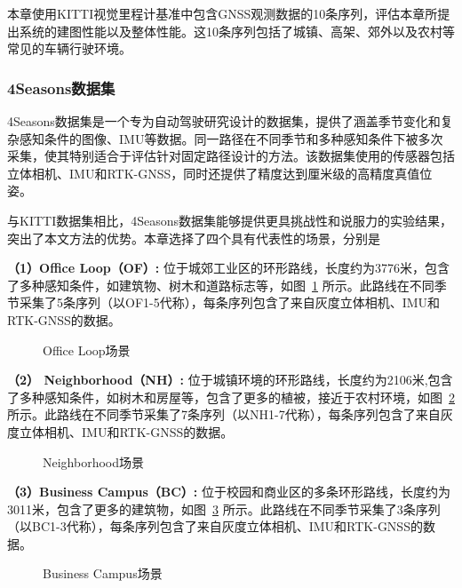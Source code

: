 本章使用KITTI视觉里程计基准中包含GNSS观测数据的10条序列，评估本章所提出系统的建图性能以及整体性能。这10条序列包括了城镇、高架、郊外以及农村等常见的车辆行驶环境。

\subsubsection{4Seasons数据集}
4Seasons数据集\cite{wenzel20214seasons}是一个专为自动驾驶研究设计的数据集，提供了涵盖季节变化和复杂感知条件的图像、IMU等数据。同一路径在不同季节和多种感知条件下被多次采集，使其特别适合于评估针对固定路径设计的方法。该数据集使用的传感器包括立体相机、IMU和RTK-GNSS，同时还提供了精度达到厘米级的高精度真值位姿。

与KITTI数据集相比，4Seasons数据集能够提供更具挑战性和说服力的实验结果，突出了本文方法的优势。本章选择了四个具有代表性的场景，分别是

\textbf{（1）Office Loop（OF）:} 位于城郊工业区的环形路线，长度约为3776米，包含了多种感知条件，如建筑物、树木和道路标志等，如图~\ref{fig:OF_data} 所示。此路线在不同季节采集了5条序列（以OF1-5代称），每条序列包含了来自灰度立体相机、IMU和RTK-GNSS的数据。
\begin{figure}
  \centering
  \caption{Office Loop场景}
  \label{fig:OF_data}
\end{figure}

\textbf{（2） Neighborhood（NH）:} 位于城镇环境的环形路线，长度约为2106米,包含了多种感知条件，如树木和房屋等，包含了更多的植被，接近于农村环境，如图~\ref{fig:NH_data} 所示。此路线在不同季节采集了7条序列（以NH1-7代称），每条序列包含了来自灰度立体相机、IMU和RTK-GNSS的数据。

\begin{figure}
  \centering
  \caption{Neighborhood场景}
  \label{fig:NH_data}
\end{figure}

\textbf{（3）Business Campus（BC）:} 位于校园和商业区的多条环形路线，长度约为3011米，包含了更多的建筑物，如图~\ref{fig:BC_data} 所示。此路线在不同季节采集了3条序列（以BC1-3代称），每条序列包含了来自灰度立体相机、IMU和RTK-GNSS的数据。

\begin{figure}
  \centering
  \caption{Business Campus场景}
  \label{fig:BC_data}
\end{figure}

